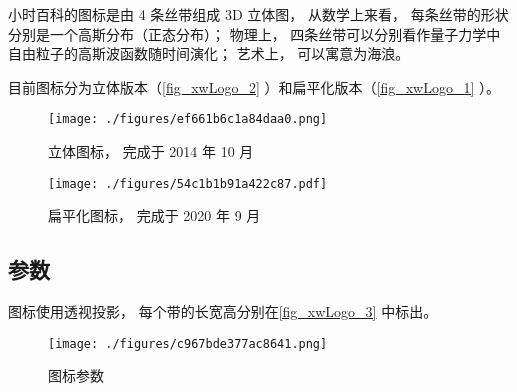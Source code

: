 
\begin{issues}
\issueTODO
\end{issues}

小时百科的图标是由 4 条丝带组成 3D 立体图， 从数学上来看， 每条丝带的形状分别是一个高斯分布（正态分布）； 物理上， 四条丝带可以分别看作量子力学中自由粒子的高斯波函数随时间演化； 艺术上， 可以寓意为海浪。

目前图标分为立体版本（\autoref{fig_xwLogo_2} ）和扁平化版本（\autoref{fig_xwLogo_1} ）。

\begin{figure}[ht]
\centering
\texttt{[image: ./figures/ef661b6c1a84daa0.png]}
\caption{立体图标， 完成于 2014 年 10 月} \label{fig_xwLogo_2}
\end{figure}

\begin{figure}[ht]
\centering
\texttt{[image: ./figures/54c1b1b91a422c87.pdf]}
\caption{扁平化图标， 完成于 2020 年 9 月} \label{fig_xwLogo_1}
\end{figure}

\subsection{参数}
图标使用透视投影， 每个带的长宽高分别在\autoref{fig_xwLogo_3} 中标出。
\begin{figure}[ht]
\centering
\texttt{[image: ./figures/c967bde377ac8641.png]}
\caption{图标参数} \label{fig_xwLogo_3}
\end{figure}
